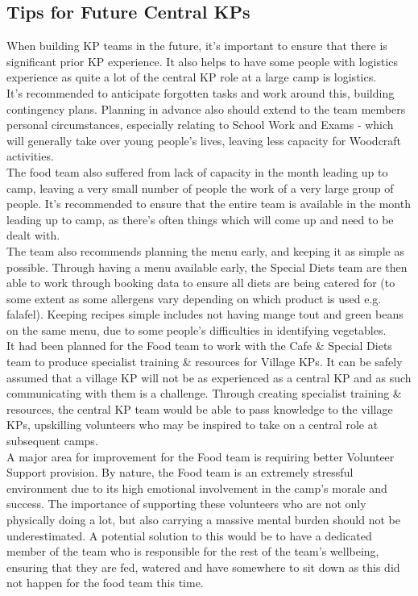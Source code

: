\subsection{Tips for Future Central KPs}
When building KP teams in the future, it's important to ensure that there is significant prior KP experience. It also helps to have some people with logistics experience as quite a lot of the central KP role at a large camp is logistics. \\

It's recommended to anticipate forgotten tasks and work around this, building contingency plans. Planning in advance also should extend to the team members personal circumstances, especially relating to School Work and Exams - which will generally take over young people's lives, leaving less capacity for Woodcraft activities.\\

The food team also suffered from lack of capacity in the month leading up to camp, leaving a very small number of people the work of a very large group of people. It's recommended to ensure that the entire team is available in the month leading up to camp, as there's often things which will come up and need to be dealt with.\\

The team also recommends planning the menu early, and keeping it as simple as possible. Through having a menu available early, the Special Diets team are then able to work through booking data to ensure all diets are being catered for (to some extent as some allergens vary depending on which product is used e.g. falafel). Keeping recipes simple includes not having mange tout and green beans on the same menu, due to some people's difficulties in identifying vegetables.\\

It had been planned for the Food team to work with the Cafe \& Special Diets team to produce specialist training \& resources for Village KPs. It can be safely assumed that a village KP will not be as experienced as a central KP and as such communicating with them is a challenge. Through creating specialist training \& resources, the central KP team would be able to pass knowledge to the village KPs, upskilling volunteers who may be inspired to take on a central role at subsequent camps. \\

A major area for improvement for the Food team is requiring better Volunteer Support provision. By nature, the Food team is an extremely stressful environment due to its high emotional involvement in the camp's morale and success. The importance of supporting these volunteers who are not only physically doing a lot, but also carrying a massive mental burden should not be underestimated. A potential solution to this would be to have a dedicated member of the team who is responsible for the rest of the team's wellbeing, ensuring that they are fed, watered and have somewhere to sit down as this did not happen for the food team this time.\\

